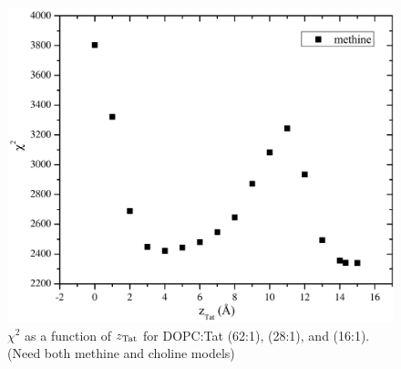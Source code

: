 \begin{figure}[htbp]
  \includegraphics[scale=0.3]{./figures/Tat/SDP_Results/DOPC_Tat_16to1_X2}
  \caption{$\chi^2$ as a function of $z_\textrm{Tat}$ for DOPC:Tat (62:1), (28:1), 
  and (16:1). (Need both methine and choline models)}
  \label{fig:DOPC_Tat_X2}
\end{figure}

